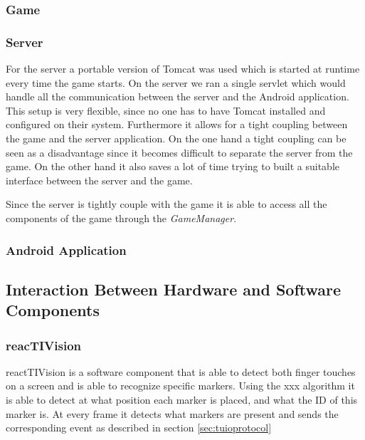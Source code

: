 \documentclass[a4paper,10pt]{article}
\begin{document}
		\subsubsection{Game}
		
		
		\subsubsection{Server}
		For the server a portable version of Tomcat was used which is started at runtime every time the game starts.
		On the server we ran a single servlet which would handle all the communication between the server and the Android application.
		This setup is very flexible, since no one has to have Tomcat installed and configured on their system.
		Furthermore it allows for a tight coupling between the game and the server application.
		On the one hand a tight coupling can be seen as a disadvantage since it becomes difficult to separate the server from the game.
		On the other hand it also saves a lot of time trying to built a suitable interface between the server and the game.
				
		Since the server is tightly couple with the game it is able to access all the components of the game through the \emph{GameManager}.
		
		\subsubsection{Android Application}
		
	\subsection{Interaction Between Hardware and Software Components}

		\subsubsection{reacTIVision}
		\label{sec:reactivision}
		reactTIVision is a software component that is able to detect both finger touches on a screen and is able to recognize specific markers. 
		Using the xxx algorithm it is able to detect at what position each marker is placed, and what the ID of this marker is. 
		At every frame it detects what markers are present and sends the corresponding event as described in section \ref{sec:tuioprotocol}
		
\end{document}
